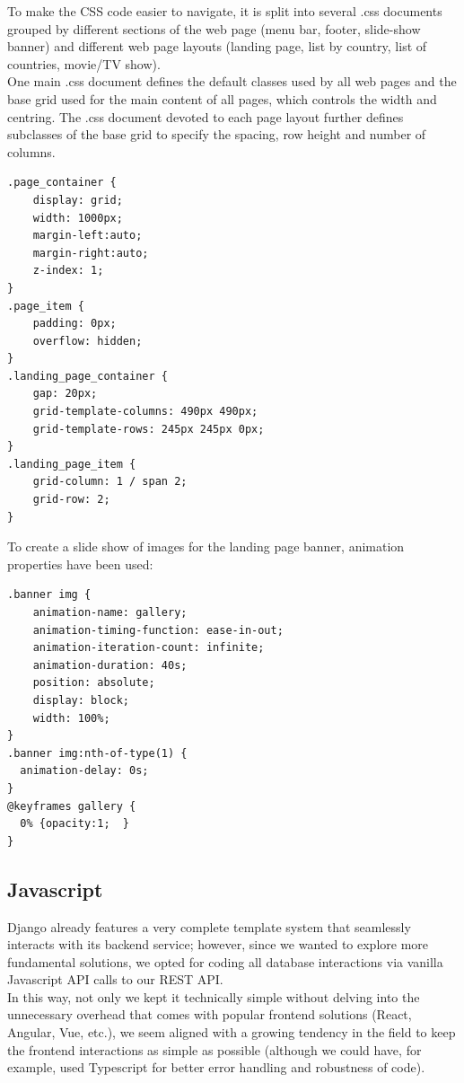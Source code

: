 \documentclass[letterpaper,twocolumn]{article}
\begin{document}
To make the CSS code easier to navigate, it is split into several .css documents grouped by different sections of the web page (menu bar, footer, slide-show banner) and different web page layouts (landing page, list by country, list of countries, movie/TV show). \\

One main .css document defines the default classes used by all web pages and the base grid used for the main content of all pages, which controls the width and centring. The .css document devoted to each page layout further defines subclasses of the base grid to specify the spacing, row height and number of columns. 

\begin{verbatim}
.page_container {
	display: grid;
	width: 1000px;
	margin-left:auto;
	margin-right:auto;
	z-index: 1;
}
.page_item {
	padding: 0px;
	overflow: hidden;
}
.landing_page_container {
	gap: 20px;
	grid-template-columns: 490px 490px;
	grid-template-rows: 245px 245px 0px;
}
.landing_page_item {
	grid-column: 1 / span 2;
	grid-row: 2;
}
\end{verbatim}
To create a slide show of images for the landing page banner, animation properties have been used:

\begin{verbatim}
.banner img {
	animation-name: gallery;
	animation-timing-function: ease-in-out;
	animation-iteration-count: infinite;
	animation-duration: 40s;
	position: absolute;
	display: block;
	width: 100%;
}
.banner img:nth-of-type(1) {
  animation-delay: 0s;
}
@keyframes gallery {
  0% {opacity:1;  }
}
\end{verbatim}

\subsection{Javascript}

Django already features a very complete template system that seamlessly interacts with its backend service; however, since we wanted to explore more fundamental solutions, we opted for coding all database interactions via vanilla Javascript API calls to our REST API.\\

In this way, not only we kept it technically simple without delving into the unnecessary overhead that comes with popular frontend solutions (React, Angular, Vue, etc.), we seem aligned with a growing tendency in the field to keep the frontend interactions as simple as possible (although we could have, for example, used Typescript for better error handling and robustness of code). 
\end{document}

